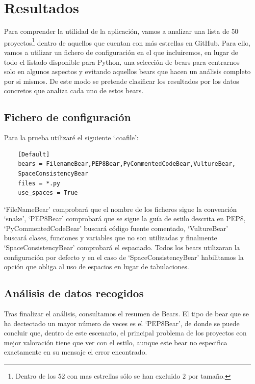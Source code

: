 \documentclass[a4paper, 12pt]{book}
\begin{document}

\cleardoublepage
\chapter{Resultados}
Para comprender la utilidad de la aplicación, vamos a analizar una lista de 50 proyectos\footnote{Dentro de los 52 con mas estrellas sólo se han excluido 2 por tamaño.} dentro de aquellos que cuentan con más estrellas en GitHub. Para ello, vamos a utilizar un fichero de configuración en el que incluiremos, en lugar de todo el listado disponible para Python, una selección de bears para centrarnos solo en algunos aspectos y evitando aquellos bears que hacen un análisis completo por si mismos. De este modo se pretende clasificar los resultados por los datos concretos que analiza cada uno de estos bears.

\section{Fichero de configuración}
\label{sec:_coafile}
Para la prueba utilizaré el siguiente `.coafile':

{\footnotesize
\begin{verbatim}
    [Default]
    bears = FilenameBear,PEP8Bear,PyCommentedCodeBear,VultureBear,
    SpaceConsistencyBear
    files = *.py
    use_spaces = True
\end{verbatim}
}
`FileNameBear' comprobará que el nombre de los ficheros sigue la convención `snake', `PEP8Bear' comprobará que se sigue la guía de estilo descrita en PEP8, `PyCommentedCodeBear' buscará código fuente comentado, `VultureBear' buscará clases, funciones y variables que no son utilizadas y finalmente `SpaceConsistencyBear' comprobará el espaciado. Todos los bears utilizaran la configuración por defecto y en el caso de `SpaceConsistencyBear' habilitamos la opción que obliga al uso de espacios en lugar de tabulaciones.

\section{Análisis de datos recogidos}
\label{sec:_datarec}
Tras finalizar el análisis, consultamos el resumen de Bears. El tipo de bear que se ha dectectado un mayor número de veces es el `PEP8Bear', de donde se puede concluir que, dentro de este escenario, el principal problema de los proyectos con mejor valoración tiene que ver con el estilo, aunque este bear no especifica exactamente en su mensaje el error encontrado.
\end{document}
